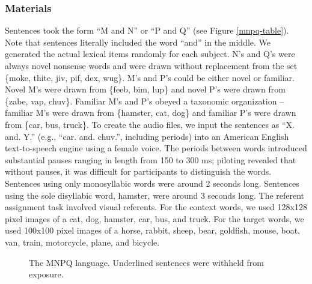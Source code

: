 \documentclass[man,floatsintext]{apa6}
\begin{document}
\subsubsection{Materials}
Sentences took the form ``M and N'' or ``P and Q'' (see Figure \ref{mnpq-table}). Note that sentences literally included the word ``and'' in the middle. We generated the actual lexical items randomly for each subject. N's and Q's were always novel nonsense words and were drawn without replacement from the set \{moke, thite, jiv, pif, dex, wug\}. M's and P's could be either novel or familiar. Novel M's were drawn from \{feeb, bim, lup\} and novel P's were drawn from \{zabe, vap, chuv\}. Familiar M's and P's obeyed a taxonomic organization -- familiar M's were drawn from \{hamster, cat, dog\} and familiar P's were drawn from \{car, bus, truck\}. To create the audio files, we input the sentences as ``X. and. Y.'' (e.g., ``car. and. chuv.'', including periods) into an American English text-to-speech engine using a female voice. The periods between words introduced substantial pauses ranging in length from 150 to 300 ms; piloting revealed that without pauses, it was difficult for participants to distinguish the words. Sentences using only monosyllabic words were around 2 seconds long. Sentences using the sole disyllabic word, hamster, were around 3 seconds long.
The referent assignment task involved visual referents. For the context words, we used 128x128 pixel images of a cat, dog, hamster, car, bus, and truck. For the target words, we used 100x100 pixel images of a horse, rabbit, sheep, bear, goldfish, mouse, boat, van, train, motorcycle, plane, and bicycle.

\begin{figure}[t]
  \begin{center}
  \caption{The MNPQ language. Underlined sentences were withheld from exposure.}
  \vskip 0.12in
  \end{center}
  \vspace{-2ex}
\end{figure}
\end{document}
